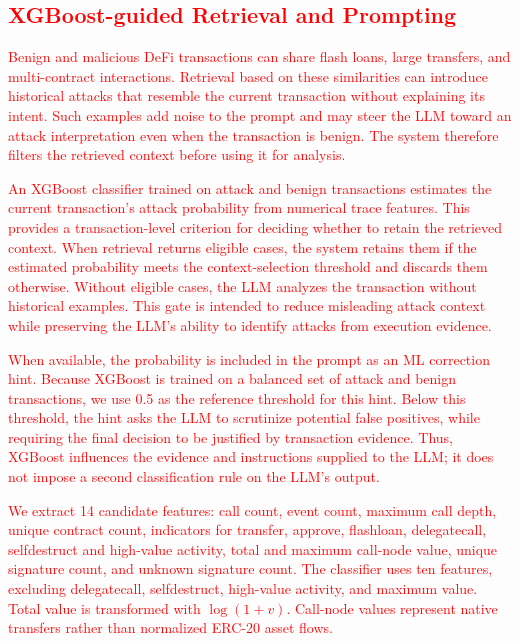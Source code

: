 \subsection{\textcolor{red}{XGBoost-guided Retrieval and Prompting}}
\label{sec:xgb-guidance}

\textcolor{red}{Benign and malicious DeFi transactions can share flash loans, large transfers, and multi-contract interactions. Retrieval based on these similarities can introduce historical attacks that resemble the current transaction without explaining its intent. Such examples add noise to the prompt and may steer the LLM toward an attack interpretation even when the transaction is benign. The system therefore filters the retrieved context before using it for analysis.}

\textcolor{red}{An XGBoost classifier trained on attack and benign transactions estimates the current transaction's attack probability from numerical trace features. This provides a transaction-level criterion for deciding whether to retain the retrieved context. When retrieval returns eligible cases, the system retains them if the estimated probability meets the context-selection threshold and discards them otherwise. Without eligible cases, the LLM analyzes the transaction without historical examples. This gate is intended to reduce misleading attack context while preserving the LLM's ability to identify attacks from execution evidence.}

\textcolor{red}{When available, the probability is included in the prompt as an ML correction hint. Because XGBoost is trained on a balanced set of attack and benign transactions, we use 0.5 as the reference threshold for this hint. Below this threshold, the hint asks the LLM to scrutinize potential false positives, while requiring the final decision to be justified by transaction evidence. Thus, XGBoost influences the evidence and instructions supplied to the LLM; it does not impose a second classification rule on the LLM's output.}

\textcolor{red}{We extract 14 candidate features: call count, event count, maximum call depth, unique contract count, indicators for transfer, approve, flashloan, delegatecall, selfdestruct and high-value activity, total and maximum call-node value, unique signature count, and unknown signature count. The classifier uses ten features, excluding delegatecall, selfdestruct, high-value activity, and maximum value. Total value is transformed with $\log(1+v)$. Call-node values represent native transfers rather than normalized ERC-20 asset flows.}


